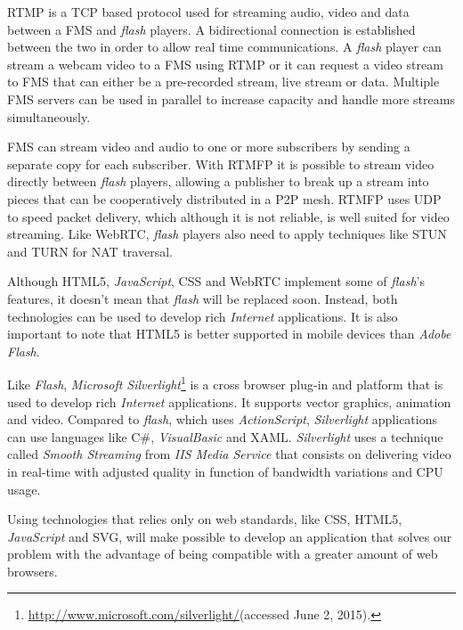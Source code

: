   \ac{RTMP} is a \ac{TCP} based protocol used for streaming audio, video and data between a \ac{FMS} and \emph{flash} players. A bidirectional connection is established between the two in order to allow real time communications. A \emph{flash} player can stream a webcam video to a \ac{FMS} using \ac{RTMP} or it can request a video stream to \ac{FMS} that can either be a pre-recorded stream, live stream or data. Multiple \ac{FMS} servers can be used in parallel to increase capacity and handle more streams simultaneously.

  \ac{FMS} can stream video and audio to one or more subscribers by sending a separate copy for each subscriber. With \ac{RTMFP} it is possible to stream video directly between \emph{flash} players, allowing a publisher to break up a stream into pieces that can be cooperatively distributed in a P2P mesh. \ac{RTMFP} uses \ac{UDP} to speed packet delivery, which although it is not reliable, is well suited for video streaming. Like \ac{WebRTC}, \emph{flash} players also need to apply techniques like \ac{STUN} and \ac{TURN} for \ac{NAT} traversal.

  Although \ac{HTML}5, \emph{JavaScript}, \ac{CSS} and \ac{WebRTC} implement some of \emph{flash}'s features, it doesn't mean that \emph{flash} will be replaced soon.
  Instead, both technologies can be used to develop rich \emph{Internet} applications.
  It is also important to note that \ac{HTML}5 is better supported in mobile devices than \emph{Adobe Flash}. 

  Like \emph{Flash}, \emph{Microsoft Silverlight}\footnote{\url{http://www.microsoft.com/silverlight/}(accessed June 2, 2015).} is a cross browser plug-in and platform that is used to develop rich \emph{Internet} applications. It supports vector graphics, animation and video. Compared to \emph{flash}, which uses \emph{ActionScript}, \emph{Silverlight} applications can use languages like C\#, \emph{VisualBasic} and \ac{XAML}. \emph{Silverlight} uses a technique called \emph{Smooth Streaming} from \emph{IIS Media Service} that consists on delivering video in real-time with adjusted quality in function of bandwidth variations and \ac{CPU} usage.

  Using technologies that relies only on web standards, like \ac{CSS}, \ac{HTML}5, \emph{JavaScript} and \ac{SVG}, will make possible to develop an application that solves our problem with the advantage of being compatible with a greater amount of web browsers.


